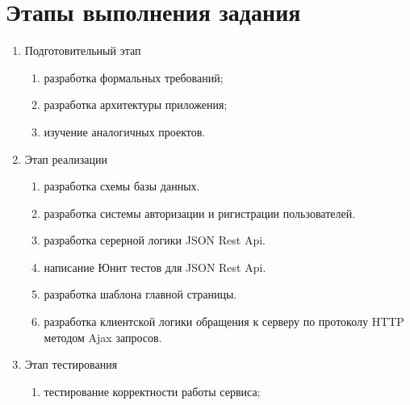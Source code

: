\section{Этапы выполнения задания}
\label{sec:practice:task_steps}

\begin{enumerate}
  \item Подготовительный этап
  \begin{enumerate}
    \item разработка формальных требований;
    \item разработка архитектуры приложения;
    \item изучение аналогичных проектов. 
  \end{enumerate}
  
  \item Этап реализации
  \begin{enumerate}
    \item разработка схемы базы данных.
    \item разработка системы авторизации и ригистрации пользователей.
    \item разработка серерной логики JSON Rest Api.
    \item написание Юнит тестов для JSON Rest Api.
    \item разработка шаблона главной страницы.
    \item разработка клиентской логики обращения к серверу по протоколу HTTP методом Ajax запросов.
  \end{enumerate}

  \item Этап тестирования
  \begin{enumerate}
    \item тестирование корректности работы сервиса;
  \end{enumerate}
\end{enumerate}

